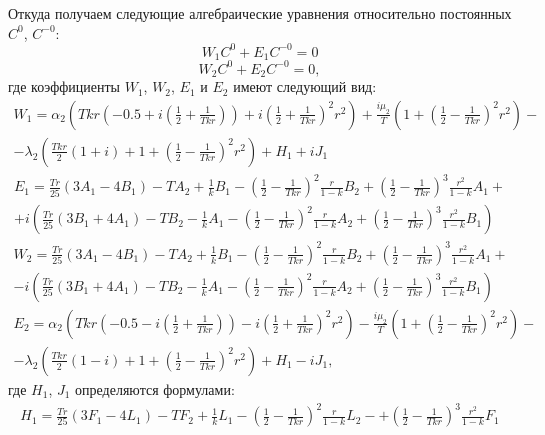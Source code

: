 \documentclass[12pt]{article}
\begin{document}
Откуда получаем следующие алгебраические уравнения относительно постоянных $C^0$, $C^{-0}$:
\begin{equation}\label{opr}
  W_1 C^0 + E_1 C^{-0} =0
\end{equation}
\begin{equation*}
  W_2 C^0 + E_2 C^{-0} =0 ,
\end{equation*}
где коэффициенты $W_1$, $W_2$, $E_1$ и $E_2$ имеют следующий вид:
\begin{multline*}
W_1=\alpha_2 \left( T k r  \left ( -0.5+i(\frac{1}{2}+\frac{1}{T k r}) \right) +i(\frac{1}{2}+\frac{1}{T k r})^2 r^2 \right)+\frac{i \mu_2}{T} \left( 1+(\frac{1}{2}-\frac{1}{T k r})^2 r^2 \right)-\\  - \lambda_2 \left( \frac{T k r}{2}   (1+i)+1+(\frac{1}{2}-\frac{1}{T k r})^2 r^2 \right)+H_1+i J_1
\end{multline*}
\begin{multline*}
E_1=\frac{T r}{25} (3 A_1 - 4 B_1)-T A_2+\frac{1}{k} B_1 - (\frac{1}{2}-\frac{1}{T k r})^2 \frac{r}{1-k}B_2+ (\frac{1}{2}-\frac{1}{T k r})^3 \frac{r^2}{1-k}A_1+\\ + i \left( \frac{T r}{25} (3 B_1 +4 A_1)-T B_2-\frac{1}{k} A_1 - (\frac{1}{2}-\frac{1}{T k r})^2 \frac{r}{1-k}A_2+ (\frac{1}{2}-\frac{1}{T k r})^3 \frac{r^2}{1-k}B_1 
\right)
\end{multline*}
\begin{multline*}
W_2=\frac{T r}{25} (3 A_1 - 4 B_1)-T A_2+\frac{1}{k} B_1 - (\frac{1}{2}-\frac{1}{T k r})^2 \frac{r}{1-k}B_2+ (\frac{1}{2}-\frac{1}{T k r})^3 \frac{r^2}{1-k}A_1+\\ - i \left( \frac{T r}{25} (3 B_1 +4 A_1)-T B_2-\frac{1}{k} A_1 - (\frac{1}{2}-\frac{1}{T k r})^2 \frac{r}{1-k}A_2+ (\frac{1}{2}-\frac{1}{T k r})^3 \frac{r^2}{1-k}B_1 
\right)
\end{multline*}
\begin{multline*}
E_2=\alpha_2 \left( T k r  \left ( -0.5-i(\frac{1}{2}+\frac{1}{T k r}) \right) -i(\frac{1}{2}+\frac{1}{T k r})^2 r^2 \right)-\frac{i \mu_2}{T} \left( 1+(\frac{1}{2}-\frac{1}{T k r})^2 r^2 \right)-\\  - \lambda_2 \left( \frac{T k r}{2}   (1-i)+1+(\frac{1}{2}-\frac{1}{T k r})^2 r^2 \right)+H_1-i J_1,
\end{multline*}
где $H_1$, $J_1$ определяются формулами:
\begin{multline*}
H_1=\frac{T r}{25} (3F_1 - 4 L_1)-T F_2+\frac{1}{k}L_1 - (\frac{1}{2}-\frac{1}{T k r})^2 \frac{r}{1-k}L_2-+ (\frac{1}{2}-\frac{1}{T k r})^3 \frac{r^2}{1-k}F_1
\end{multline*}
\end{document}
